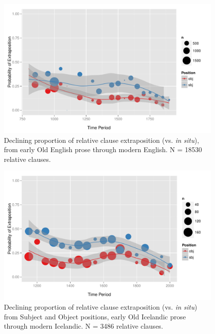 \begin{figure}

  \includegraphics[width=1.1\textwidth]{stableVarTalks/exSbjObjYearBinned50Loessymeb.pdf}
\caption{Declining proportion of relative clause extraposition (vs. \textsl{in situ}), from early Old English prose through modern English. N = 18530 relative clauses.}
\label{engfig}       %
\end{figure}

\begin{figure}

  \includegraphics[width=1.1\textwidth]{stableVarTalks/exSbjObjYearBinned50Loessice.pdf}
\caption{Declining proportion of relative clause extraposition (vs. \textsl{in situ}) from Subject and Object positions, early Old Icelandic prose through modern Icelandic. N = 3486 relative clauses.}
\label{icefig}       
\end{figure}


